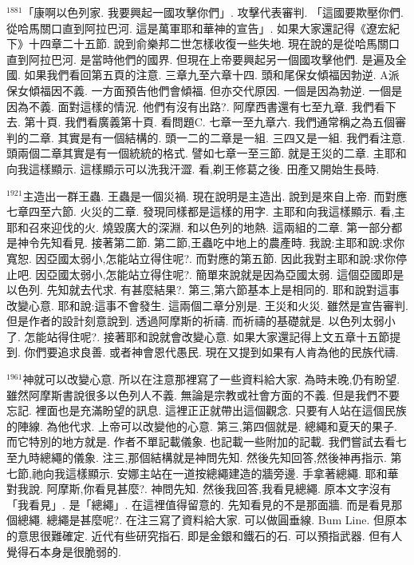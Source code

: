 \documentclass{book}
\begin{document}
$^{1881}$「康啊以色列家.
我要興起一國攻擊你們」.
攻擊代表審判.
「這國要欺壓你們.
從哈馬關口直到阿拉巴河.
這是萬軍耶和華神的宣告」.
如果大家還記得《遼宏紀下》十四章二十五節.
說到俞樂邦二世怎樣收復一些失地.
現在說的是從哈馬關口直到阿拉巴河.
是當時他們的國界.
但現在上帝要興起另一個國攻擊他們.
是遍及全國.
如果我們看回第五頁的注意.
三章九至六章十四.
頭和尾保女傾福因勃逆.
A派保女傾福因不義.
一方面預告他們會傾福.
但亦交代原因.
一個是因為勃逆.
一個是因為不義.
面對這樣的情況.
他們有沒有出路?.
阿摩西書還有七至九章.
我們看下去.
第十頁.
我們看廣義第十頁.
看問題C.
七章一至九章六.
我們通常稱之為五個審判的二章.
其實是有一個結構的.
頭一二的二章是一組.
三四又是一組.
我們看注意.
頭兩個二章其實是有一個統統的格式.
譬如七章一至三節.
就是王災的二章.
主耶和向我這樣顯示.
這樣顯示可以洗我汗澀.
看,剃王修葛之後.
田產又開始生長時.

$^{1921}$主造出一群王蟲.
王蟲是一個災禍.
現在說明是主造出.
說到是來自上帝.
而對應七章四至六節.
火災的二章.
發現同樣都是這樣的用字.
主耶和向我這樣顯示.
看,主耶和召來迎伐的火.
燒毀廣大的深淵.
和以色列的地熱.
這兩組的二章.
第一部分都是神令先知看見.
接著第二節.
第二節,王蟲吃中地上的農產時.
我說:主耶和說:求你寬恕.
因亞國太弱小,怎能站立得住呢?.
而對應的第五節.
因此我對主耶和說:求你停止吧.
因亞國太弱小,怎能站立得住呢?.
簡單來說就是因為亞國太弱.
這個亞國即是以色列.
先知就去代求.
有甚麼結果?.
第三,第六節基本上是相同的.
耶和說對這事改變心意.
耶和說:這事不會發生.
這兩個二章分別是.
王災和火災.
雖然是宣告審判.
但是作者的設計刻意說到.
透過阿摩斯的祈禱.
而祈禱的基礎就是.
以色列太弱小了.
怎能站得住呢?.
接著耶和說就會改變心意.
如果大家還記得上文五章十五節提到.
你們要追求良善.
或者神會恩代愚民.
現在又提到如果有人肯為他的民族代禱.

$^{1961}$神就可以改變心意.
所以在注意那裡寫了一些資料給大家.
為時未晚,仍有盼望.
雖然阿摩斯書說很多以色列人不義.
無論是宗教或社會方面的不義.
但是我們不要忘記.
裡面也是充滿盼望的訊息.
這裡正正就帶出這個觀念.
只要有人站在這個民族的陣線.
為他代求.
上帝可以改變他的心意.
第三,第四個就是.
總繩和夏天的果子.
而它特別的地方就是.
作者不單記載儀象.
也記載一些附加的記載.
我們嘗試去看七至九時總繩的儀象.
注三,那個結構就是神問先知.
然後先知回答,然後神再指示.
第七節,祂向我這樣顯示.
安娜主站在一道按總繩建造的牆旁邊.
手拿著總繩.
耶和華對我說.
阿摩斯,你看見甚麼?.
神問先知.
然後我回答,我看見總繩.
原本文字沒有「我看見」.
是「總繩」.
在這裡值得留意的.
先知看見的不是那面牆.
而是看見那個總繩.
總繩是甚麼呢?.
在注三寫了資料給大家.
可以做圓垂線.
Bum Line.
但原本的意思很難確定.
近代有些研究指石.
即是金銀和鐵石的石.
可以預指武器.
但有人覺得石本身是很脆弱的.
\end{document}
